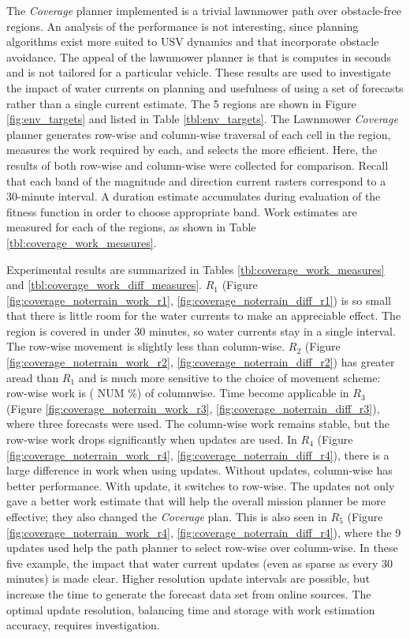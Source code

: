 \documentclass{tamuccthesis}
\begin{document}
The \textit{Coverage} planner implemented is a trivial lawnmower path over obstacle-free regions. An analysis of the performance is not interesting, since planning algorithms exist more suited to USV dynamics and that incorporate obstacle avoidance. The appeal of the lawnmower planner is that is computes in seconds and is not tailored for a particular vehicle. These results are used to investigate the impact of water currents on planning and usefulness of using a set of forecasts rather than a single current estimate. The 5 regions are shown in Figure \ref{fig:env_targets} and listed in Table \ref{tbl:env_targets}. The Lawnmower \textit{Coverage} planner generates row-wise and column-wise traversal of each cell in the region, measures the work required by each, and selects the more efficient. Here, the results of both row-wise and column-wise were collected for comparison. Recall that each band of the magnitude and direction current rasters correspond to a 30-minute interval. A duration estimate accumulates during evaluation of the fitness function in order to choose appropriate band. Work estimates are measured for each of the regions, as shown in Table \ref{tbl:coverage_work_measures}. 

Experimental results are summarized in Tables \ref{tbl:coverage_work_measures} and \ref{tbl:coverage_work_diff_measures}. $R_1$ (Figure \ref{fig:coverage_noterrain_work_r1}, \ref{fig:coverage_noterrain_diff_r1}) is so small that there is little room for the water currents to make an appreciable effect. The region is covered in under 30 minutes, so water currents stay in a single interval. The row-wise movement is slightly less than column-wise. $R_2$ (Figure \ref{fig:coverage_noterrain_work_r2}, \ref{fig:coverage_noterrain_diff_r2}) has greater aread than $R_1$ and is much more sensitive to the choice of movement scheme: row-wise work is ( NUM \%) of columnwise. Time become applicable in $R_3$ (Figure \ref{fig:coverage_noterrain_work_r3}, \ref{fig:coverage_noterrain_diff_r3}), where three forecasts were used. The column-wise work remains stable, but the row-wise work drops significantly when updates are used. In $R_4$ (Figure \ref{fig:coverage_noterrain_work_r4}, \ref{fig:coverage_noterrain_diff_r4}), there is a large difference in work when using updates. Without updates, column-wise has better performance. With update, it switches to row-wise. The updates not only gave a better work estimate that will help the overall mission planner be more effective; they also changed the \textit{Coverage} plan. This is also seen in $R_5$ (Figure \ref{fig:coverage_noterrain_work_r4}, \ref{fig:coverage_noterrain_diff_r4}), where the 9 updates used help the path planner to select row-wise over column-wise. In these five example, the impact that water current updates (even as sparse as every 30 minutes) is made clear. Higher resolution update intervals are possible, but increase the time to generate the forecast data set from online sources. The optimal update resolution, balancing time and storage with work estimation accuracy, requires investigation.
\end{document}

